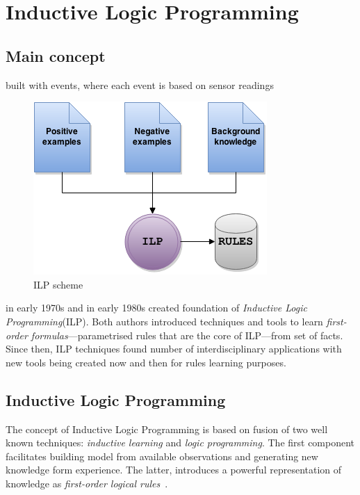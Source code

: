 \documentclass[12pt, a4paper, pdflatex, leqno, twoside, openright]{report}
\begin{document}
\chapter{Inductive Logic Programming\label{ch:ILP}}
  \section{Main concept}
  built with events, where each event is based on sensor readings

\begin{figure}
  \centering
  \includegraphics[scale=.5]{./gfx/ilp}
  \caption{ILP scheme\label{fig:ilp}}
\end{figure}

\citeauthor{plotkin1972automatic} in early 1970s and \citeauthor{shapiro1983algorithmic} in early 1980s created foundation of \emph{Inductive Logic Programming}(ILP). Both authors introduced techniques and tools to learn \emph{first-order formulas}---parametrised rules that are the core of ILP---from set of facts. Since then, ILP techniques found number of interdisciplinary applications with new tools being created now and then for rules learning purposes.

  \section{Inductive Logic Programming}
The concept of Inductive Logic Programming is based on fusion of two well known techniques: \emph{inductive learning} and \emph{logic programming}. The first component facilitates building model from available observations and generating new knowledge form experience. The latter, introduces a powerful representation of knowledge as \emph{first-order logical rules}~\citep{muggleton1994inductive,muggleton1995inverse}.\\
\end{document}
